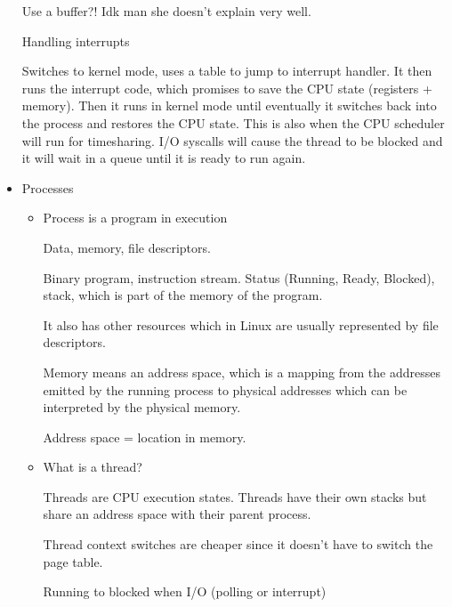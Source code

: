 \documentclass{report}
\begin{document}
\begin{itemize}
\begin{mdframed}
            Use a buffer?! Idk man she doesn't explain very well.
        \end{mdframed}
        \begin{mdframed}
           Handling interrupts 

           Switches to kernel mode, uses a table to jump to interrupt
           handler. It then runs the interrupt code, which promises to save
           the CPU state (registers + memory). Then it runs in kernel mode until
           eventually it switches back into the process and restores the CPU
           state. This is also when the CPU scheduler will run for timesharing.
           I/O syscalls will cause the thread to be blocked and it will wait in a
           queue until it is ready to run again.
        \end{mdframed}
    \item Processes
        \begin{itemize}
            \item Process is a program in execution
                \begin{mdframed}
                    Data, memory, file descriptors.

                    Binary program, instruction stream.
                    Status (Running, Ready, Blocked), stack, which is part
                    of the memory of the program.

                    It also has other resources which in Linux are usually represented by file
                    descriptors.

                    Memory means an address space, which is a mapping from the addresses
                    emitted by the running process to physical addresses which can be
                    interpreted by the physical memory.

                    Address space = location in memory.
                \end{mdframed}
            \item What is a thread?
                \begin{mdframed}
                    Threads are CPU execution states. Threads have their own stacks but
                    share an address space with their parent process.

                    Thread context switches are cheaper since it doesn't have to switch
                    the page table.

                    Running to blocked when I/O (polling or interrupt)


\end{mdframed}
\end{itemize}
\end{itemize}
\end{document}
